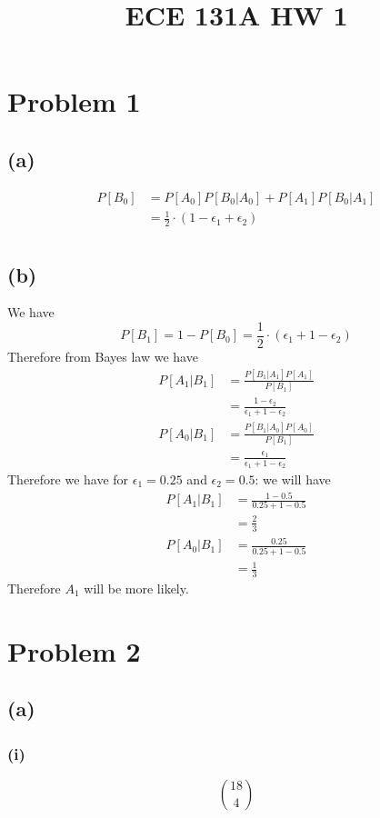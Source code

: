 
\title{ECE 131A HW 1}

\maketitle
\section*{Problem 1}
\subsection*{(a)}
\begin{align*}
    P[B_0]&=P[A_0]P[B_0|A_0]+P[A_1]P[B_0|A_1]\\
    &=\boxed{\frac{1}{2}\cdot(1-\epsilon_1+\epsilon_2)}\\
\end{align*}
\subsection*{(b)}
We have 
$$P[B_1]=1-P[B_0]=\frac{1}{2}\cdot(\epsilon_1+1-\epsilon_2)$$
Therefore from Bayes law we have
\begin{align*}
    P[A_1|B_1]&=\frac{P[B_1|A_1]P[A_1]}{P[B_1]}\\
    &=\frac{1-\epsilon_2}{\epsilon_1+1-\epsilon_2}
\end{align*}
\begin{align*}
    P[A_0|B_1]&=\frac{P[B_1|A_0]P[A_0]}{P[B_1]}\\
    &=\frac{\epsilon_1}{\epsilon_1+1-\epsilon_2}
\end{align*}
Therefore we have for $\epsilon_1=0.25$ and $\epsilon_2=0.5$:
we will have
\begin{align*}
    P[A_1|B_1]&=\frac{1-0.5}{0.25+1-0.5}\\
    &=\frac{2}{3}\\
    P[A_0|B_1]&=\frac{0.25}{0.25+1-0.5}\\
    &=\frac{1}{3}
\end{align*}
Therefore $A_1$ will be more likely. 
\section*{Problem 2}
\subsection*{(a)}
\subsubsection*{(i)}
$$\boxed{18 \choose 4}$$
